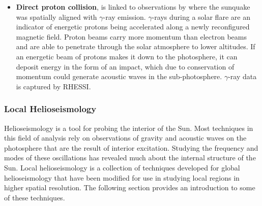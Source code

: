 \begin{itemize}
\item \textbf{Direct proton collision}, is linked to observations by \cite{2007ApJ...664..573Z} where the sunquake was spatially aligned with $\gamma$-ray emission. $\gamma$-rays during a solar flare are an indicator of energetic protons being accelerated along a newly reconfigured magnetic field. Proton beams carry more momentum than electron beams and are able to penetrate through the solar atmosphere to lower altitudes. If an energetic beam of protons makes it down to the photosphere, it can deposit energy in the form of an impact, which due to conservation of momentum could generate acoustic waves in the sub-photosphere. $\gamma$-ray data is captured by RHESSI. \\

\end{itemize}


\subsubsection{Local Helioseismology}
Helioseismology is a tool for probing the interior of the Sun. Most techniques in this field of analysis rely on observations of gravity and acoustic waves on the photosphere that are the result of interior excitation. Studying the frequency and modes of these oscillations has revealed much about the internal structure of the Sun. Local helioseismology is a collection of techniques developed for global helioseismology that have been modified for use in studying local regions in higher spatial resolution. The following section provides an introduction to some of these techniques.


